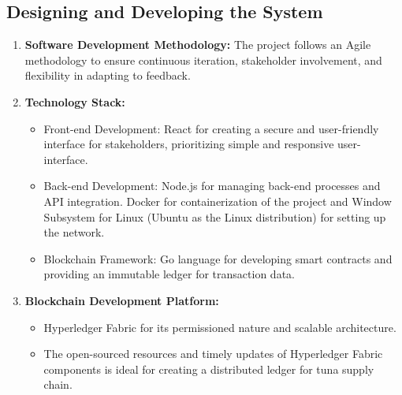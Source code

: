 \subsection{Designing and Developing the System}

\begin{enumerate}
	\item \textbf{Software Development Methodology:} The project follows an Agile methodology to ensure continuous iteration, stakeholder involvement, and flexibility in adapting to feedback.
	\item \textbf{Technology Stack:} 
		\begin{itemize}
			\item Front-end Development: React for creating a secure and user-friendly interface for stakeholders, prioritizing simple and responsive user-interface.
			\item Back-end Development: Node.js for managing back-end processes and API integration. Docker for containerization of the project and Window Subsystem for Linux (Ubuntu as the Linux distribution) for setting up the network.
			\item Blockchain Framework: Go language for developing smart contracts and providing an immutable ledger for transaction data.
		\end{itemize}
	\item \textbf{Blockchain Development Platform:} 
		\begin{itemize}
			\item Hyperledger Fabric for its permissioned nature and scalable architecture.
			\item The open-sourced resources and timely updates of Hyperledger Fabric components is ideal for creating a distributed ledger for tuna supply chain.
		\end{itemize}
\end{enumerate}

